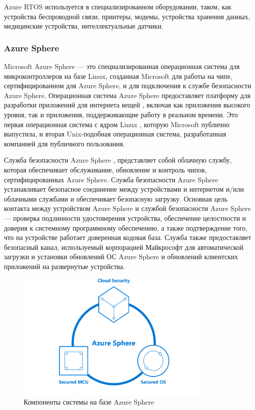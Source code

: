 Azure RTOS используется в специализированном оборудовании, таком, как устройства беспроводной связи, принтеры, модемы, устройства хранения данных, медицинские устройства, интеллектуальные датчики.



\subsubsection{Azure Sphere}

Microsoft Azure Sphere \cite{Azure_Sphere_main} --- это специализированная операционная система для микроконтроллеров на базе Linux, созданная Microsoft для работы на чипе, сертифицированном для Azure Sphere, и для подключения к службе безопасности Azure Sphere. Операционная система Azure Sphere предоставляет платформу для разработки приложений для интернета вещей , включая как приложения высокого уровня, так и приложения, поддерживающие работу в реальном времени. Это первая операционная система с ядром Linux \cite{linux} , которую Microsoft публично выпустила, и вторая Unix-подобная операционная система, разработанная компанией для публичного пользования.

Служба безопасности Azure Sphere \cite{Azure_Sphere_terminology} \cite{Azure_Sphere_overview}, представляет собой облачную службу, которая обеспечивает обслуживание, обновление и контроль чипов, сертифицированных Azure Sphere. Служба безопасности Azure Sphere устанавливает безопасное соединение между устройствами и интернетом и/или облачными службами и обеспечивает безопасную загрузку. Основная цель контакта между устройством Azure Sphere и службой безопасности Azure Sphere --- проверка подлинности удостоверения устройства, обеспечение целостности и доверия к системному программному обеспечению, а также подтверждение того, что на устройстве работает доверенная кодовая база. Служба также предоставляет безопасный канал, используемый корпорацией Майкрософт для автоматической загрузки и установки обновлений ОС Azure Sphere и обновлений клиентских приложений на развернутые устройства.

\begin{figure}[h]
	\centering
	\includegraphics[width=0.85\textwidth]{img/azure-sphere.png}
	\caption{Компоненты системы на базе Azure Sphere}
	\label{fig:azure}
\end{figure} 

